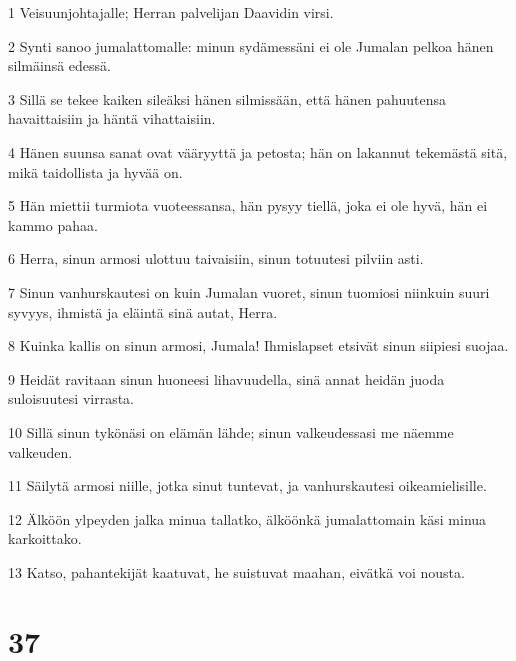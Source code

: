\par 1 Veisuunjohtajalle; Herran palvelijan Daavidin virsi.
\par 2 Synti sanoo jumalattomalle: minun sydämessäni ei ole Jumalan pelkoa hänen silmäinsä edessä.
\par 3 Sillä se tekee kaiken sileäksi hänen silmissään, että hänen pahuutensa havaittaisiin ja häntä vihattaisiin.
\par 4 Hänen suunsa sanat ovat vääryyttä ja petosta; hän on lakannut tekemästä sitä, mikä taidollista ja hyvää on.
\par 5 Hän miettii turmiota vuoteessansa, hän pysyy tiellä, joka ei ole hyvä, hän ei kammo pahaa.
\par 6 Herra, sinun armosi ulottuu taivaisiin, sinun totuutesi pilviin asti.
\par 7 Sinun vanhurskautesi on kuin Jumalan vuoret, sinun tuomiosi niinkuin suuri syvyys, ihmistä ja eläintä sinä autat, Herra.
\par 8 Kuinka kallis on sinun armosi, Jumala! Ihmislapset etsivät sinun siipiesi suojaa.
\par 9 Heidät ravitaan sinun huoneesi lihavuudella, sinä annat heidän juoda suloisuutesi virrasta.
\par 10 Sillä sinun tykönäsi on elämän lähde; sinun valkeudessasi me näemme valkeuden.
\par 11 Säilytä armosi niille, jotka sinut tuntevat, ja vanhurskautesi oikeamielisille.
\par 12 Älköön ylpeyden jalka minua tallatko, älköönkä jumalattomain käsi minua karkoittako.
\par 13 Katso, pahantekijät kaatuvat, he suistuvat maahan, eivätkä voi nousta.

\chapter{37}

